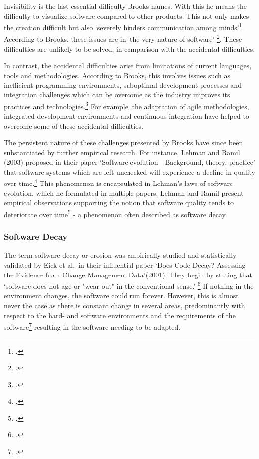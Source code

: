 Invisibility is the last essential difficulty Brooks names. With this he means the difficulty to visualize software compared to other products. This not only makes the creation difficult but also `severely hinders communication among minds'\footcite[4]{brooksNoSilverBullet1987}.
According to Brooks, these issues are in `the very nature of software' \footcite[2]{brooksNoSilverBullet1987}. These difficulties are unlikely to be solved, in comparison with the accidental difficulties.

In contrast, the accidental difficulties arise from limitations of current languages, tools and methodologies. According to Brooks, this involves issues such as inefficient programming environments, suboptimal development processes and integration challenges which can be overcome as the industry improves its practices and technologies.\footcite[5-6]{brooksNoSilverBullet1987}
For example, the adaptation of agile methodologies, integrated development environments and continuous integration have helped to overcome some of these accidental difficulties.

The persistent nature of these challenges presented by Brooks have since been substantiated by further empirical research. For instance, Lehman and Ramil (2003) proposed in their paper `Software evolution—Background, theory, practice' that software systems which are left unchecked will experience a decline in quality over time.\footcite[34]{lehmanSoftwareEvolutionBackground2003}
This phenomenon is encapsulated in Lehman's laws of software evolution, which he formulated in multiple papers.  Lehman and Ramil present empirical observations supporting the notion that software quality tends to deteriorate over time\footcite[42]{lehmanSoftwareEvolutionBackground2003} - a phenomenon often described as
software decay.

\subsubsection{Software Decay}
The term software decay or erosion was empirically studied and statistically validated by Eick et al.\ in their influential paper `Does Code Decay? Assessing the Evidence from Change Management Data'(2001). They begin by stating that `software does not age or "wear out" in the conventional sense.' \footcite[1]{eickDoesCodeDecay2001}
If nothing in the environment changes, the software could run forever. However, this is almost never the case as there is constant change in several areas, predominantly with respect to the hard- and software environments and the requirements of the software\footcite[1]{eickDoesCodeDecay2001} resulting in the software needing to be adapted.

